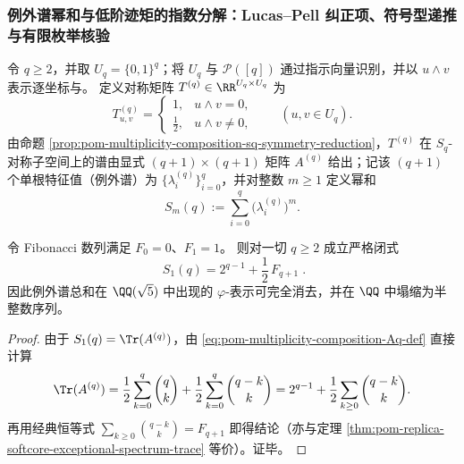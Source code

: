 \subsubsection{例外谱幂和与低阶迹矩的指数分解：Lucas--Pell 纠正项、符号型递推与有限枚举核验}\label{subsubsec:xi-exceptional-power-sum-low-moment-decomposition}
令 \(q\ge 2\)，并取 \(U_q=\{0,1\}^q\)；将 \(U_q\) 与 \(\mathcal P([q])\) 通过指示向量识别，并以 \(u\wedge v\) 表示逐坐标与。
定义对称矩阵 \(T^{(q)}\in\RR^{U_q\times U_q}\) 为
\[
T^{(q)}_{u,v}=
\begin{cases}
1,&u\wedge v=0,\\[2pt]
\frac12,&u\wedge v\neq 0,
\end{cases}
\qquad (u,v\in U_q).
\]
由命题 \ref{prop:pom-multiplicity-composition-sq-symmetry-reduction}，\(T^{(q)}\) 在 \(S_q\)-对称子空间上的谱由显式 \((q+1)\times(q+1)\) 矩阵 \(A^{(q)}\) 给出；记该 \((q+1)\) 个单根特征值（例外谱）为 \(\{\lambda_i^{(q)}\}_{i=0}^{q}\)，并对整数 \(m\ge 1\) 定义幂和
\[
S_m(q):=\sum_{i=0}^{q}\big(\lambda_i^{(q)}\big)^m.
\]

\begin{conclusion}[例外谱一次幂和的整系数塌缩：\texorpdfstring{$S_1(q)=2^{q-1}+\frac12F_{q+1}$}{S1(q)=2^{q-1}+1/2 F_{q+1}}]\label{con:xi-terminal-replica-softcore-exceptional-power-sum-m1-integer-collapse}
令 Fibonacci 数列满足 \(F_0=0\)、\(F_1=1\)。
则对一切 \(q\ge 2\) 成立严格闭式
\[
\boxed{\;
S_1(q)=2^{q-1}+\frac12\,F_{q+1}\; }.
\]
因此例外谱总和在 \(\QQ(\sqrt5)\) 中出现的 \(\varphi\)-表示可完全消去，并在 \(\QQ\) 中塌缩为半整数序列。
\end{conclusion}
\begin{proof}
由于 \(S_1(q)=\Tr(A^{(q)})\)，由 \eqref{eq:pom-multiplicity-composition-Aq-def} 直接计算
\[
\Tr(A^{(q)})
=\frac12\sum_{k=0}^{q}\binom{q}{k}+\frac12\sum_{k=0}^{q}\binom{q-k}{k}
=2^{q-1}+\frac12\sum_{k\ge 0}\binom{q-k}{k}.
\]
再用经典恒等式 \(\sum_{k\ge 0}\binom{q-k}{k}=F_{q+1}\) 即得结论（亦与定理 \ref{thm:pom-replica-softcore-exceptional-spectrum-trace} 等价）。证毕。
\end{proof}

